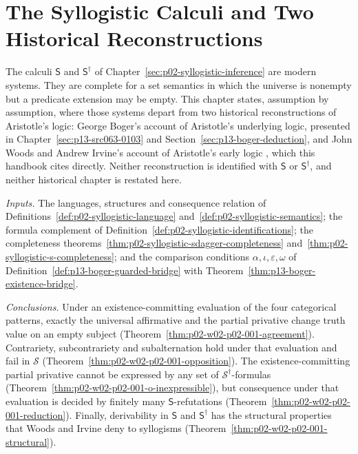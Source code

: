 \chapter{The Syllogistic Calculi and Two Historical Reconstructions}
\label{sec:p02-w02-p02-001-historical-contrast}

The calculi \(\mathsf S\) and \(\mathsf S^\dagger\) of
Chapter~\ref{sec:p02-syllogistic-inference} are modern systems. They are
complete for a set semantics in which the universe is nonempty but a
predicate extension may be empty. This chapter states, assumption by
assumption, where those systems depart from two historical reconstructions
of Aristotle's logic: George Boger's account of Aristotle's underlying
logic, presented in Chapter~\ref{sec:p13-src063-0103} and
Section~\ref{sec:p13-boger-deduction}, and John Woods and Andrew Irvine's
account of Aristotle's early logic
\cite[pp.~27--99]{WoodsIrvine2004EarlyLogic}, which this handbook cites
directly. Neither reconstruction is identified with \(\mathsf S\) or
\(\mathsf S^\dagger\), and neither historical chapter is restated here.

\emph{Inputs.} The languages, structures and consequence relation of
Definitions~\ref{def:p02-syllogistic-language}
and~\ref{def:p02-syllogistic-semantics}; the formula complement of
Definition~\ref{def:p02-syllogistic-identifications}; the completeness
theorems~\ref{thm:p02-syllogistic-sdagger-completeness}
and~\ref{thm:p02-syllogistic-s-completeness}; and the comparison
conditions \(\alpha,\iota,\varepsilon,\omega\) of
Definition~\ref{def:p13-boger-guarded-bridge} with
Theorem~\ref{thm:p13-boger-existence-bridge}.

\emph{Conclusions.} Under an existence-committing evaluation of the four
categorical patterns, exactly the universal affirmative and the partial
privative change truth value on an empty subject
(Theorem~\ref{thm:p02-w02-p02-001-agreement}). Contrariety, subcontrariety
and subalternation hold under that evaluation and fail in \(\mathcal S\)
(Theorem~\ref{thm:p02-w02-p02-001-opposition}). The existence-committing
partial privative cannot be expressed by any set of
\(\mathcal S^\dagger\)-formulas
(Theorem~\ref{thm:p02-w02-p02-001-o-inexpressible}), but consequence under
that evaluation is decided by finitely many \(\mathsf S\)-refutations
(Theorem~\ref{thm:p02-w02-p02-001-reduction}). Finally, derivability in
\(\mathsf S\) and \(\mathsf S^\dagger\) has the structural properties that
Woods and Irvine deny to syllogisms
(Theorem~\ref{thm:p02-w02-p02-001-structural}).

